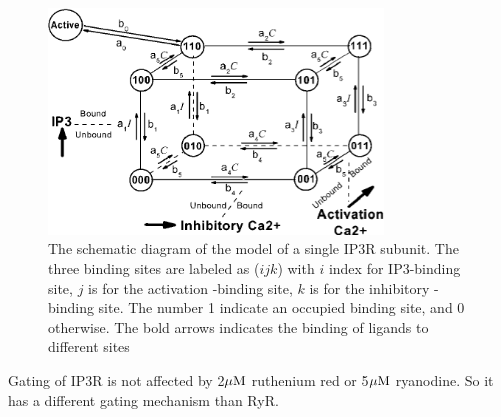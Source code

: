 \begin{figure}[hbt]
 \centerline{\includegraphics[height=6cm]{./images/IP3R_subunit_schematic.eps}}
 \caption{The schematic diagram of the model of a single IP3R
  subunit. The three binding sites are labeled as ($ijk$) with $i$ index
for IP3-binding site, $j$ is for the activation -binding
site, $k$ is for the inhibitory -binding site. The number 1
indicate an occupied binding site, and 0 otherwise. The bold arrows
indicates the binding of ligands to different sites}
\label{fig:IP3R_schematic}
\end{figure}

Gating of IP3R is not affected by 2${\mu\text{M}}$ ruthenium red or 5${\mu\text{M}}$ ryanodine.
So it has a different gating mechanism than RyR.

